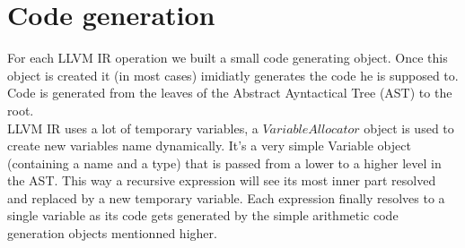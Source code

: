 \newpage\cleardoublepage{}
\section{Code generation}
 
For each LLVM IR operation we built a small code generating object. Once this object is created it (in most cases) imidiatly generates the code he is supposed to.
Code is generated from the leaves of the Abstract Ayntactical Tree (AST) to the root.\\ LLVM IR uses a lot of temporary variables, a $VariableAllocator$ object is used to create new variables name dynamically.
It's a very simple Variable object (containing a name and a type) that is passed from a lower to a higher level in the AST.
This way a recursive expression will see its most inner part resolved and replaced by a new temporary variable. Each expression finally resolves to a single variable as its code gets generated by the simple arithmetic code generation objects mentionned higher.



